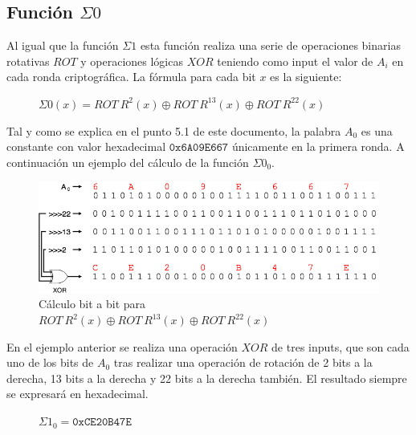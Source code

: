 \documentclass{article}
\begin{document}
    \subsection{Función $\Sigma0$}
        Al igual que la función $\Sigma1$ esta función realiza una serie de operaciones binarias rotativas $ROT$ y operaciones lógicas $XOR$ teniendo como input el valor de $A_{i}$ en cada ronda criptográfica. La fórmula para cada bit $x$ es la siguiente:
            \begin{figure}[H]
            \centering
                $\Sigma0(x) = ROT \ R^{2}(x) \oplus ROT \ R^{13}(x) \oplus ROT \ R^{22}(x)$
            \end{figure}
        Tal y como se explica en el punto 5.1 de este documento, la palabra $A_{0}$ es una constante con valor hexadecimal $\texttt{0x6A09E667}$ únicamente en la primera ronda. A continuación un ejemplo del cálculo de la función $\Sigma0_{0}$.
            \begin{figure}[H]
            \centering
                \includegraphics[scale=0.41]{img/SHA-256-function_Sigma0.png}
                \caption{Cálculo bit a bit para $ROT \ R^{2}(x) \oplus ROT \ R^{13}(x) \oplus ROT \ R^{22}(x)$}
            \end{figure}
        En el ejemplo anterior se realiza una operación $XOR$ de tres inputs, que son cada uno de los bits de $A_{0}$ tras realizar una operación de rotación de 2 bits a la derecha, 13 bits a la derecha y 22 bits a la derecha también. El resultado siempre se expresará en hexadecimal.
            \begin{figure}[H]
            \centering
                $\Sigma1_{0} = \texttt{0xCE20B47E}$
            \end{figure}
    
\end{document}
